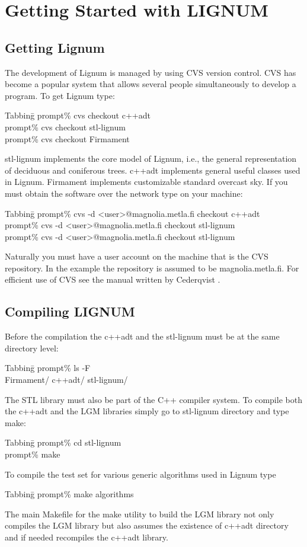 \chapter{Getting Started with LIGNUM}

\section{Getting Lignum}

The development of Lignum is managed by using CVS version control. CVS
has become a popular  system that allows several people simultaneously
to develop a program. To get Lignum type:
\begin{tabbing}
Tabbing\=\kill
\>prompt\% cvs checkout c++adt \\
\>prompt\% cvs checkout stl-lignum \\
\>prompt\% cvs checkout Firmament
\end{tabbing}

stl-lignum  implements the  core model  of Lignum,  i.e.,  the general
representation  of deciduous and  coniferous trees.  c++adt implements
general   useful  classes   used  in   Lignum.   Firmament  implements
customizable standard  overcast sky. If  you must obtain  the software
over the network type on your machine:
\begin{tabbing}
Tabbing\=\kill
\>prompt\% cvs -d <user>@magnolia.metla.fi checkout c++adt \\ 
\>prompt\% cvs -d <user>@magnolia.metla.fi checkout stl-lignum \\
\>prompt\% cvs -d <user>@magnolia.metla.fi checkout stl-lignum 
\end{tabbing}
Naturally you must have a user  account on the machine that is the CVS
repository.   In   the  example  the  repository  is   assumed  to  be
magnolia.metla.fi. For efficient use of  CVS see the manual written by
Cederqvist \cite{Ced}.

\section{Compiling LIGNUM}

Before the compilation the c++adt and the stl-lignum must be at the
same directory level:
\begin{tabbing}
Tabbing\=\kill
\>prompt\% ls -F \\
\>Firmament/ c++adt/ stl-lignum/ 
\end{tabbing}
The STL  library must  also be  part of the  C++ compiler  system.  To
compile both the c++adt and  the LGM libraries simply go to stl-lignum
directory and type make:
\begin{tabbing}
Tabbing\=\kill
\>prompt\% cd stl-lignum \\
\>prompt\% make
\end{tabbing}
To compile the test set for various generic algorithms used in Lignum 
type
\begin{tabbing}
Tabbing\=\kill
\>prompt\% make algorithms
\end{tabbing} 
The main  Makefile for the make  utility to build the  LGM library not
only compiles the LGM library but also assumes the existence of c++adt
directory and if needed recompiles the c++adt library.

